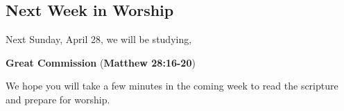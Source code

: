 \subsection{Next Week in Worship}
\label{nextweekworship}

Next Sunday, April 28, we will be studying, 

 \textbf{Great Commission} 
 (\textbf{Matthew 28:16-20}) 

 We hope you will take a few minutes in the coming week to read the scripture and prepare for worship.
